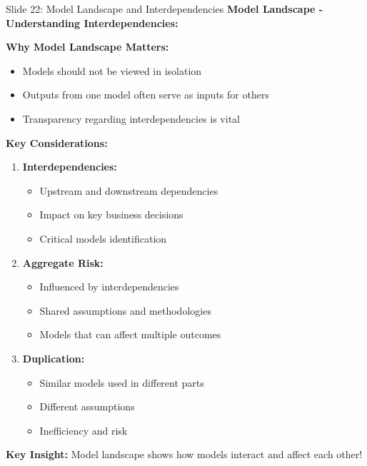 \documentclass[8pt]{beamer}
\begin{document}
	\begin{frame}{Slide 22: Model Landscape and Interdependencies}
		\fontsize{6.5}{7.5}\selectfont
		\textbf{Model Landscape - Understanding Interdependencies:}
		
		\vspace{0.1cm}
		\textbf{Why Model Landscape Matters:}
		\begin{itemize}
			\item Models should not be viewed in isolation
			\item Outputs from one model often serve as inputs for others
			\item Transparency regarding interdependencies is vital
		\end{itemize}
		
		\vspace{0.1cm}
		\textbf{Key Considerations:}
		\begin{enumerate}
			\item \textbf{Interdependencies:}
			\begin{itemize}
				\item Upstream and downstream dependencies
				\item Impact on key business decisions
				\item Critical models identification
			\end{itemize}
			\item \textbf{Aggregate Risk:}
			\begin{itemize}
				\item Influenced by interdependencies
				\item Shared assumptions and methodologies
				\item Models that can affect multiple outcomes
			\end{itemize}
			\item \textbf{Duplication:}
			\begin{itemize}
				\item Similar models used in different parts
				\item Different assumptions
				\item Inefficiency and risk
			\end{itemize}
		\end{enumerate}
		
		\textcolor{myblue}{\textbf{Key Insight:}} Model landscape shows \textcolor{myblue}{how models interact and affect each other}!
	\end{frame}
	
\end{document}
